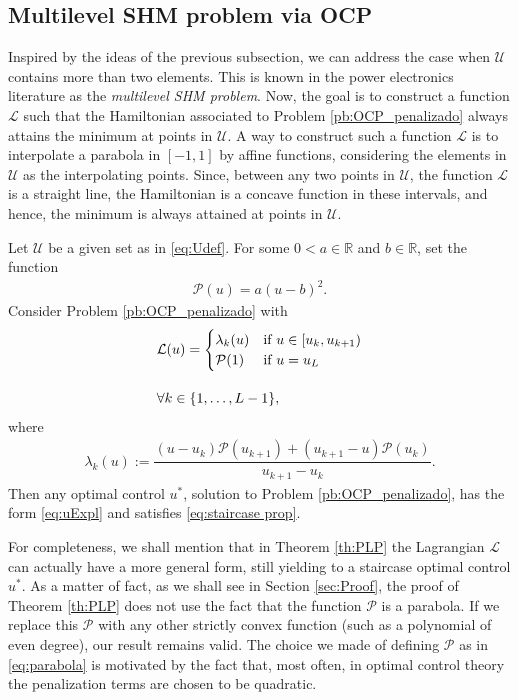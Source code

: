 \documentclass[twocolumn]{autart}    %
\begin{document}
\subsection{Multilevel SHM problem via OCP}

Inspired by the ideas of the previous subsection, we can address the case when $\mathcal{U}$ contains more than two elements. This is known in the power electronics literature as the \textit{multilevel SHM problem}. Now, the goal is to construct a function $\mathcal{L}$ such that the Hamiltonian associated to Problem \ref{pb:OCP_penalizado} always attains the minimum at points in $\mathcal{U}$.
A way to construct such a function $\mathcal{L}$ is to interpolate a parabola in $[-1,1]$ by affine functions, considering the elements in $\mathcal{U}$ as the interpolating points.  Since, between any two points in $\mathcal{U}$,  the function $\mathcal{L}$ is a straight line,  the Hamiltonian is a concave function in these intervals, and hence, the minimum is always attained at points in $\mathcal{U}$.

\vspace{1em}
\begin{theorem}\label{th:PLP}
Let $\mathcal{U}$ be a given set as in \eqref{eq:Udef}. For some $0<a\in\mathbb{R}$ and $b\in \mathbb{R}$, set the function
\begin{align}\label{eq:parabola}
	\mathcal{P}(u) = a (u-b)^2.
\end{align}
Consider Problem \ref{pb:OCP_penalizado} with 
\begin{align}\label{eq:PLP}
	&\mathcal{L}(u) = \begin{cases}
            \lambda_k(u) & \text{if }  u \in [u_k,u_{k+1}) \\ \mathcal{P}(1) & \text{if } u = u_{L} 
    \end{cases} 
	\\[10pt]
	&\notag \forall k \in \{1,\dots,L-1\}, 
\end{align}
where 
\begin{align}\label{eq:lambda k}
	\lambda_k(u):= \dfrac{ (u-u_k)\mathcal{P}(u_{k+1}) + (u_{k+1}- u) \mathcal{P}(u_k)}{u_{k+1} - u_k}.
\end{align}
Then any optimal control $u^\ast$, solution to Problem \ref{pb:OCP_penalizado}, has the form \eqref{eq:uExpl} and satisfies \eqref{eq:staircase prop}.
\end{theorem}

\medskip

\begin{remark}
For completeness, we shall mention that in Theorem \ref{th:PLP} the Lagrangian $\mathcal L$ can actually have a more general form, still yielding to a staircase optimal control $u^\ast$. As a matter of fact, as we shall see in Section \ref{sec:Proof}, the proof of Theorem \ref{th:PLP} does not use the fact that the function $\mathcal P$ is a parabola. If we replace this $\mathcal P$ with any other strictly convex function (such as a polynomial of even degree), our result remains valid. The choice we made of defining $\mathcal P$ as in \eqref{eq:parabola} is motivated by the fact that, most often, in optimal control theory the penalization terms are chosen to be quadratic.
\end{remark}
\end{document}
